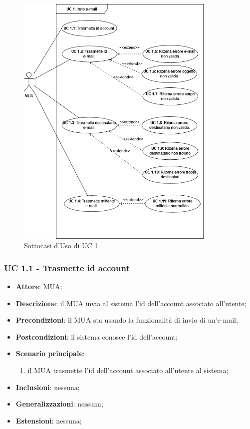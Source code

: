     \begin{figure}[H]
        \includegraphics[width=0.85\textwidth]{sections/uc_imgs/UC01.png}
        \centering
        \caption{Sottocasi d'Uso di UC 1}
    \end{figure}

    \subsubsection{UC 1.1 - Trasmette id account} \label{sec:UC1.1}
    \begin{itemize}
        \item \textbf{Attore}: MUA;
        \item \textbf{Descrizione}: il MUA invia al sistema l'id dell'account associato all'utente;
        \item \textbf{Precondizioni}: il MUA sta usando la funzionalità di invio di un'e-mail;
        \item \textbf{Postcondizioni}: il sistema conosce l'id dell'account;
        \item \textbf{Scenario principale}:
            \begin{enumerate}
                \item il MUA trasmette l'id dell'account associato all'utente al sistema;
            \end{enumerate}
        \item \textbf{Inclusioni}: nessuna;
        \item \textbf{Generalizzazioni}: nessuna;
        \item \textbf{Estensioni}: nessuna;
    \end{itemize}

